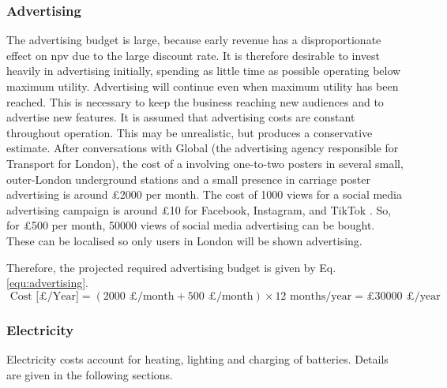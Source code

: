 \documentclass{report_template_oxford}
\begin{document}
\subsubsection{Advertising}
The advertising budget is large, because early revenue has a disproportionate effect on \gls{npv} due to the large discount rate. It is therefore desirable to invest heavily in advertising initially, spending as little time as possible operating below maximum utility. Advertising will continue even when maximum utility has been reached. This is necessary to keep the business reaching new audiences and to advertise new features. It is assumed that advertising costs are constant throughout operation. This may be unrealistic, but produces a conservative estimate. After conversations with Global (the advertising agency responsible for Transport for London), the cost of a  involving one-to-two posters in several small, outer-London underground stations and a small presence in carriage poster advertising is around £2000 per month. The cost of 1000 views for a social media advertising campaign is around £10 for Facebook, Instagram, and TikTok \cite{mediaperformancePaidSocial}. So, for £500 per month, 50000 views of social media advertising can be bought. These can be localised so only users in London will be shown advertising. \newline

\noindent Therefore, the projected required advertising budget is given by Eq. \ref{equ:advertising}.
\begin{equation}
    \label{equ:advertising}
    \text{ Cost [£/Year]} = \left (2000\text{ £/month} + 500\text{ £/month}\right ) \times 12\text{ months/year} = £30000\text{ £/year}
\end{equation}



\subsubsection{Electricity}
Electricity costs account for heating, lighting and charging of batteries. Details are given in the following sections.
\end{document}
